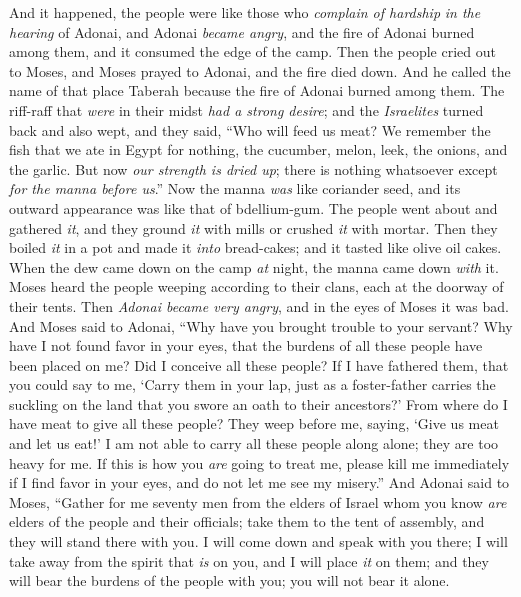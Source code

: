\begin{biblechapter} %
 And it happened, the people were like those who \textit{complain of hardship} \textit{in the hearing} of Adonai, and Adonai \textit{became angry}, and the fire of Adonai burned among them, and it consumed the edge of the camp.
\verse Then the people cried out to Moses, and Moses prayed to Adonai, and the fire died down.
\verse And he called the name of that place Taberah because the fire of Adonai burned among them.
\verse The riff-raff that \textit{were} in their midst \textit{had a strong desire}; and the \textit{Israelites} turned back and also wept, and they said, “Who will feed us meat?
\verse We remember the fish that we ate in Egypt for nothing, the cucumber, melon, leek, the onions, and the garlic.
\verse But now \textit{our strength is dried up}; there is nothing whatsoever except \textit{for the manna before us}.”
\verse Now the manna \textit{was} like coriander seed, and its outward appearance was like that of bdellium-gum.
\verse The people went about and gathered \textit{it}, and they ground \textit{it} with mills or crushed \textit{it} with mortar. Then they boiled \textit{it} in a pot and made it \textit{into} bread-cakes; and it tasted like olive oil cakes.
\verse When the dew came down on the camp \textit{at} night, the manna came down \textit{with} it.
\verse Moses heard the people weeping according to their clans, each at the doorway of their tents. Then \textit{Adonai became very angry}, and in the eyes of Moses it was bad.
\verse And Moses said to Adonai, “Why have you brought trouble to your servant? Why have I not found favor in your eyes, that the burdens of all these people have been placed on me?
\verse Did I conceive all these people? If I have fathered them, that you could say to me, ‘Carry them in your lap, just as a foster-father carries the suckling on the land that you swore an oath to their ancestors?’
\verse From where do I have meat to give all these people? They weep before me, saying, ‘Give us meat and let us eat!’
\verse I am not able to carry all these people along alone; they are too heavy for me.
\verse If this is how you \textit{are} going to treat me, please kill me immediately if I find favor in your eyes, and do not let me see my misery.”
\verse And Adonai said to Moses, “Gather for me seventy men from the elders of Israel whom you know \textit{are} elders of the people and their officials; take them to the tent of assembly, and they will stand there with you.
\verse I will come down and speak with you there; I will take away from the spirit that \textit{is} on you, and I will place \textit{it} on them; and they will bear the burdens of the people with you; you will not bear it alone.

\end{biblechapter}
